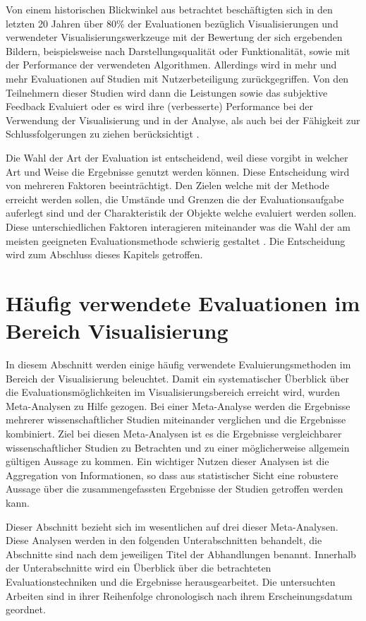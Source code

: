 \documentclass[draft=false
              ,paper=a4
              ,twoside=false
              ,fontsize=11pt
              ,headsepline
              ,BCOR10mm
              ,DIV11
              ]{scrbook}
\begin{document}
Von einem historischen Blickwinkel aus betrachtet beschäftigten sich in den letzten 20 Jahren über 80\% der Evaluationen bezüglich Visualisierungen und verwendeter Visualisierungswerkzeuge mit der Bewertung der sich ergebenden Bildern, beispielsweise nach Darstellungsqualität oder Funktionalität, sowie mit der Performance der verwendeten Algorithmen. Allerdings wird in mehr und mehr Evaluationen auf Studien mit Nutzerbeteiligung zurückgegriffen. Von den Teilnehmern dieser Studien wird dann die Leistungen sowie das subjektive Feedback Evaluiert oder es wird ihre (verbesserte) Performance bei der Verwendung der Visualisierung und in der Analyse, als auch bei der Fähigkeit zur Schlussfolgerungen zu ziehen berücksichtigt \cite{isenberg_systematic_2013}. 

Die Wahl der Art der Evaluation ist entscheidend, weil diese vorgibt in welcher Art und Weise die Ergebnisse genutzt werden können. Diese Entscheidung wird von mehreren Faktoren beeinträchtigt. Den Zielen welche mit der Methode erreicht werden sollen, die Umstände und Grenzen die der Evaluationsaufgabe auferlegt sind und der Charakteristik der Objekte welche evaluiert werden sollen. Diese unterschiedlichen Faktoren interagieren miteinander was die Wahl der am meisten geeigneten Evaluationsmethode schwierig gestaltet \cite{kitchenham_evaluating_1996-2}. Die Entscheidung wird zum Abschluss dieses Kapitels getroffen.

\section{Häufig verwendete Evaluationen im Bereich Visualisierung} %
\label{sec:häufig_verwendete_Evaluationen im Bereich Visualisierung}
In diesem Abschnitt werden einige häufig verwendete Evaluierungsmethoden im Bereich der Visualisierung beleuchtet. Damit ein systematischer Überblick über die Evaluationsmöglichkeiten im Visualisierungsbereich erreicht wird, wurden Meta-Analysen zu Hilfe gezogen. Bei einer Meta-Analyse werden die Ergebnisse mehrerer wissenschaftlicher Studien miteinander verglichen und die Ergebnisse kombiniert. Ziel bei diesen Meta-Analysen ist es die Ergebnisse vergleichbarer wissenschaftlicher Studien zu Betrachten und zu einer möglicherweise allgemein gültigen Aussage zu kommen. Ein wichtiger Nutzen dieser Analysen ist die Aggregation von Informationen, so dass aus statistischer Sicht eine robustere Aussage über die zusammengefassten Ergebnisse der Studien getroffen werden kann. 

Dieser Abschnitt bezieht sich im wesentlichen auf drei dieser Meta-Analysen. Diese Analysen werden in den folgenden Unterabschnitten behandelt, die Abschnitte sind nach dem jeweiligen Titel der Abhandlungen benannt. Innerhalb der Unterabschnitte wird ein Überblick über die betrachteten Evaluationstechniken und die Ergebnisse herausgearbeitet. Die untersuchten Arbeiten sind in ihrer Reihenfolge chronologisch nach ihrem Erscheinungsdatum geordnet.
\end{document}
